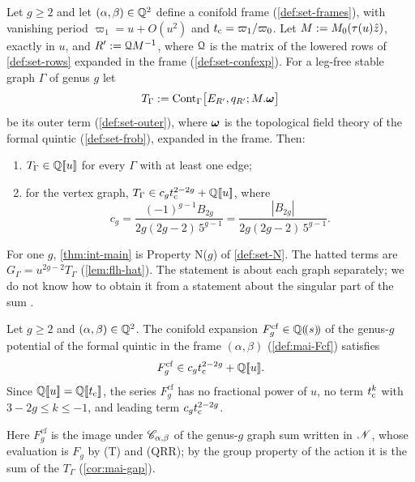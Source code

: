 \begin{thm}
\label{thm:int-main}
Let $g\geq2$ and let $(\alpha,\beta)\in\mathbb{Q}^2$ define a conifold frame (\cref{def:set-frames}), with vanishing period $\varpi_1=u+O(u^2)$ and $t_{\mathrm{c}}=\varpi_1/\varpi_0$. Let $M:=M_{0}(\tau(u)\hat{z})$, exactly in $u$, and $R':=\mathcal{Q} M^{-1}$, where $\mathcal{Q}$ is the matrix of the lowered rows of \cref{def:set-rows} expanded in the frame (\cref{def:set-confexp}). For a leg-free stable graph $\Gamma$ of genus $g$ let
\[
T_\Gamma:=\mathrm{Cont}_\Gamma\bigl[E_{R'},q_{R'};M.\boldsymbol{\omega}\bigr]
\]
be its outer term (\cref{def:set-outer}), where $\boldsymbol{\omega}$ is the topological field theory of the formal quintic (\cref{def:set-frob}), expanded in the frame. Then:
\begin{enumerate}
\item $T_\Gamma\in\mathbb{Q}[\![ u ]\!]$ for every $\Gamma$ with at least one edge;
\item for the vertex graph, $T_\Gamma\in c_gt_{\mathrm{c}}^{2-2g}+\mathbb{Q}[\![ u ]\!]$, where
\[
c_g=\frac{(-1)^{g-1}B_{2g}}{2g(2g-2)\,5^{g-1}}=\frac{|B_{2g}|}{2g(2g-2)\,5^{g-1}} .
\]
\end{enumerate}
\end{thm}

For one $g$, \cref{thm:int-main} is Property N($g$) of \cref{def:set-N}. The hatted terms are $G_\Gamma=u^{2g-2}T_\Gamma$ (\cref{lem:flh-hat}). The statement is about each graph separately; we do not know how to obtain it from a statement about the singular part of the sum .

\begin{cor}
\label{cor:int-gap}
Let $g\geq2$ and $(\alpha,\beta)\in\mathbb{Q}^2$. The conifold expansion $F_g^{\mathrm{cf}}\in\mathbb{Q}(\!(s)\!)$ of the genus-$g$ potential of the formal quintic in the frame $(\alpha,\beta)$ (\cref{def:mai-Fcf}) satisfies
\[
F_g^{\mathrm{cf}}\in c_gt_{\mathrm{c}}^{2-2g}+\mathbb{Q}[\![ u ]\!] .
\]
Since $\mathbb{Q}[\![ u ]\!]=\mathbb{Q}[\![ t_{\mathrm{c}} ]\!]$, the series $F_g^{\mathrm{cf}}$ has no fractional power of $u$, no term $t_{\mathrm{c}}^k$ with $3-2g\leq k\leq-1$, and leading term $c_gt_{\mathrm{c}}^{2-2g}$.
\end{cor}

Here $F_g^{\mathrm{cf}}$ is the image under $\mathscr{C}_{\alpha,\beta}$ of the genus-$g$ graph sum written in $\mathscr{N}$, whose evaluation is $F_g$ by (T) and (QRR); by the group property of the action \cite[Def.~2.13, Prop.~2.14]{PPZ15} it is the sum of the $T_\Gamma$ (\cref{cor:mai-gap}).

